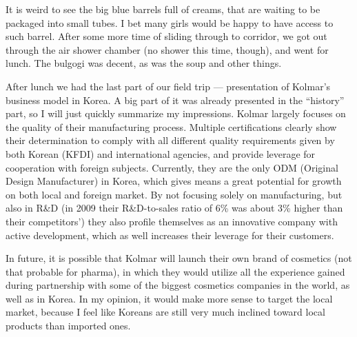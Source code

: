 \begin{post}
\begin{content}


It is weird to see the big blue barrels full of creams, that are waiting to be packaged into small tubes. I bet many girls would be happy to have access to such barrel. After some more time of sliding through to corridor, we got out through the air shower chamber (no shower this time, though), and went for lunch. The bulgogi was decent, as was the soup and other things.


After lunch we had the last part of our field trip --- presentation of Kolmar's business model in Korea. A big part of it was already presented in the ``history'' part, so I will just quickly summarize my impressions. Kolmar largely focuses on the quality of their manufacturing process. Multiple certifications clearly show their determination to comply with all different quality requirements given by both Korean (KFDI) and international agencies, and provide leverage for cooperation with foreign subjects. Currently, they are the only ODM (Original Design Manufacturer) in Korea, which gives means a great potential for growth on both local and foreign market. By not focusing solely on manufacturing, but also in R\&D (in 2009 their R\&D-to-sales ratio of 6\% was about 3\% higher than their competitors') they also profile themselves as an innovative company with active development, which as well increases their leverage for their customers.

In future, it is possible that Kolmar will launch their own brand of cosmetics (not that probable for pharma), in which they would utilize all the experience gained during partnership with some of the biggest cosmetics companies in the world, as well as in Korea. In my opinion, it would make more sense to target the local market, because I feel like Koreans are still very much inclined toward local products than imported ones.


\end{content}
\end{post}
